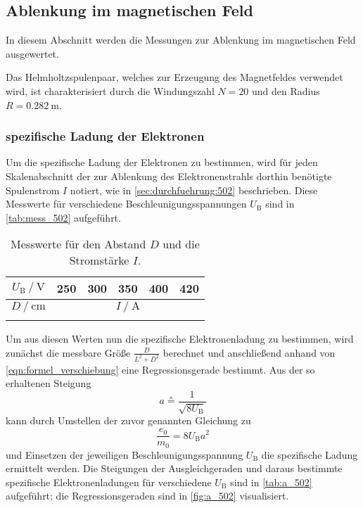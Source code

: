\subsection{Ablenkung im magnetischen Feld}
In diesem Abschnitt werden die Messungen zur Ablenkung im magnetischen Feld ausgewertet.

Das Helmholtzspulenpaar, welches zur Erzeugung des Magnetfeldes verwendet wird,
ist charakterisiert durch die Windungszahl $N = 20$
und den Radius $R = \SI{0.282}{\meter}$.

\subsubsection{spezifische Ladung der Elektronen}
\label{sec:auswertung:502:spezifische_elektronenladung}

Um die spezifische Ladung der Elektronen zu bestimmen,
wird für jeden Skalenabschnitt der zur Ablenkung des Elektronenstrahls dorthin benötigte Spulenstrom $I$ notiert,
wie in \autoref{sec:durchfuehrung:502} beschrieben.
Diese Messwerte für verschiedene Beschleunigungsspannungen $U_\text{B}$ sind in \autoref{tab:mess_502} aufgeführt.

\begin{table}
  \centering
  \caption{Messwerte für den Abstand $D$ und die Stromstärke $I$.}
  \label{tab:mess_502}
  \begin{tabular}{S | S S S S S}
  \toprule
  {$U_\text{B} \mathbin{/} \si{\volt}$} &
  {250} &
  {300} &
  {350} &
  {400} &
  {420} \\
  \midrule
  {$D \mathbin{/} \si{\centi\meter}$} &
   \\
  \midrule
  \bottomrule
  \end{tabular}
\end{table}

Um aus diesen Werten nun die spezifische Elektronenladung zu bestimmen,
wird zunächst die messbare Größe $\frac{D}{L^2 + D^2}$ berechnet
und anschließend anhand von \autoref{eqn:formel_verschiebung} eine Regressionsgerade bestimmt.
Aus der so erhaltenen Steigung
\begin{equation*}
  a \wedgeq \frac{1}{\sqrt{8 U_\text{B}}}
\end{equation*}
kann durch Umstellen der zuvor genannten Gleichung zu
\begin{equation*}
  \frac{e_0}{m_0} = 8 U_\text{B} a^2
\end{equation*}
und Einsetzen der jeweiligen Beschleunigungsspannung $U_\text{B}$
die spezifische Ladung ermittelt werden.
Die Steigungen der Ausgleichgeraden und daraus bestimmte spezifische Elektronenladungen für verschiedene $U_\text{B}$
sind in \autoref{tab:a_502} aufgeführt;
die Regressionsgeraden sind in \autoref{fig:a_502} visualisiert.

